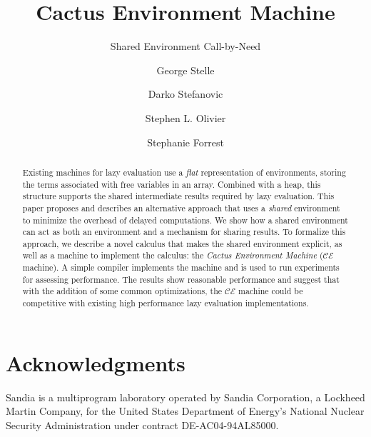 \documentclass{llncs}
\begin{document}
\title{Cactus Environment Machine}
\subtitle{Shared Environment Call-by-Need}

\author{George Stelle \and Darko Stefanovic 
        \and Stephen L. Olivier 
        \and Stephanie Forrest
        }
      

\maketitle

\begin{abstract}
Existing machines for lazy evaluation use a \emph{flat} representation of
environments, storing the terms associated with free variables in an array.
Combined with a heap, this structure supports the shared intermediate results
required by lazy evaluation.  This paper proposes and describes an alternative
approach that uses a \emph{shared} environment to minimize the overhead of
delayed computations. We show how a shared environment can act as both an
environment and a mechanism for sharing results. To formalize this approach, we
describe a novel calculus that makes the shared environment explicit, as well as
a machine to implement the calculus: the \emph{Cactus Environment Machine}
($\mathcal{CE}$ machine). A simple compiler implements the machine and is used
to run experiments for assessing performance.  The results show reasonable
performance and suggest that with the addition of some common optimizations, the
$\mathcal{CE}$ machine could be competitive with existing high performance lazy
evaluation implementations.
\end{abstract}












\section{Acknowledgments}
Sandia is a multiprogram laboratory operated by Sandia Corporation, a Lockheed
Martin Company, for the United States Department of Energy’s National Nuclear
Security Administration under contract DE-AC04-94AL85000.




% 
\end{document}
